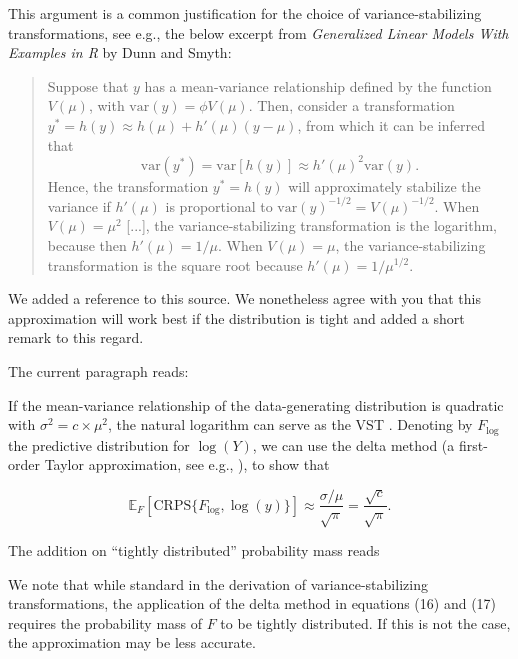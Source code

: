 \documentclass{article}
\newcommand{\black}{\color{black}}
\newcommand{\indented}{\setlength{\leftskip}{1cm}}
\newcommand{\notindented}{\setlength{\leftskip}{0cm}}
\begin{document}
\black

This argument is a common justification for the choice of variance-stabilizing transformations, see e.g., the below excerpt from \textit{Generalized Linear Models With Examples in R} by Dunn and Smyth:
\begin{quote}
Suppose that $y$ has a mean-variance relationship defined by the function $V(\mu)$, with $\text{var}(y) = \phi V(\mu)$. Then, consider a transformation $y^* = h(y) \approx h(\mu) + h'(\mu)(y - \mu)$, from which it can be inferred that
$$
\text{var}(y^*) = \text{var}[h(y)] \approx h'(\mu)^2\text{var}(y).
$$
Hence, the transformation $y^* = h(y)$ will approximately stabilize the variance if $h'(\mu)$ is proportional to $\text{var}(y)^{-1/2} = V(\mu)^{-1/2}$. When $V(\mu) = \mu^2$ [...], the variance-stabilizing transformation is the logarithm, because then $h'(\mu) = 1/\mu$.  When $V(\mu) = \mu$, the variance-stabilizing transformation is the square root because $h'(\mu) = 1/\mu^{1/2}$.
\end{quote}

We added a reference to this source. We nonetheless agree with you that this approximation will work best if the distribution is tight and added a short remark to this regard.

The current paragraph reads: 

\indented

If the mean-variance relationship of the data-generating distribution is quadratic with $\sigma^2 = c \times \mu^2$, the natural logarithm can serve as the VST \citep{guerreroTimeseriesAnalysisSupported1993}. Denoting by $F_{\log}$ the predictive distribution for $\log(Y)$, we can use the delta method (a first-order Taylor approximation, see e.g., \citealt{Dunn2018}), to show that

\begin{equation}
\mathbb{E}_F[\text{CRPS}\{F_{\log}, \log(y)\}] \approx \frac{\sigma/\mu}{\sqrt{\pi}} 
= \frac{\sqrt{c}}{\sqrt{\pi}}
.
\end{equation}

The addition on ``tightly distributed'' probability mass reads

\indented
We note that while standard in the derivation of variance-stabilizing transformations, the application of the delta method in equations (16) and (17) requires the probability mass of $F$ to be tightly distributed. If this is not the case, the approximation may be less accurate.

\notindented
\end{document}
